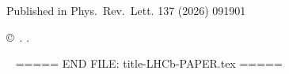 \begin{titlepage}
\begin{abstract}
\end{abstract}

\vspace*{2.0cm}

\begin{center}

Published in Phys.~Rev.~Lett. 137 (2026) 091901
\end{center}

\vspace{\fill}

{\footnotesize

\centerline{\copyright~\papercopyright. \href{\paperlicenceurl}{\paperlicence}.}}
\vspace*{2mm}

\end{titlepage}







\newpage
\setcounter{page}{2}
\mbox{~}
===== END FILE: title-LHCb-PAPER.tex =====
